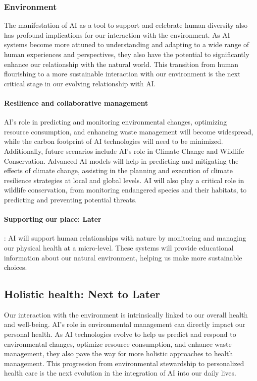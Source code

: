 \subsubsection{Environment}
The manifestation of AI as a tool to support and celebrate human diversity also has profound implications for our interaction with the environment. As AI systems become more attuned to understanding and adapting to a wide range of human experiences and perspectives, they also have the potential to significantly enhance our relationship with the natural world. This transition from human flourishing to a more sustainable interaction with our environment is the next critical stage in our evolving relationship with AI.
\paragraph{Resilience and collaborative management} 
AI's role in predicting and monitoring environmental changes, optimizing resource consumption, and enhancing waste management will become widespread, while the carbon footprint of AI technologies will need to be minimized. Additionally, future scenarios include AI's role in Climate Change and Wildlife Conservation. Advanced AI models will help in predicting and mitigating the effects of climate change, assisting in the planning and execution of climate resilience strategies at local and global levels. AI will also play a critical role in wildlife conservation, from monitoring endangered species and their habitats, to predicting and preventing potential threats. 

\paragraph{Supporting our place: Later}: 
AI will support human relationships with nature by monitoring and managing our physical health at a micro-level. These systems will provide educational information about our natural environment, helping us make more sustainable choices.
\subsection{Holistic health: Next to Later}
Our interaction with the environment is intrinsically linked to our overall health and well-being. AI’s role in environmental management can directly impact our personal health. As AI technologies evolve to help us predict and respond to environmental changes, optimize resource consumption, and enhance waste management, they also pave the way for more holistic approaches to health management. This progression from environmental stewardship to personalized health care is the next evolution in the integration of AI into our daily lives.
